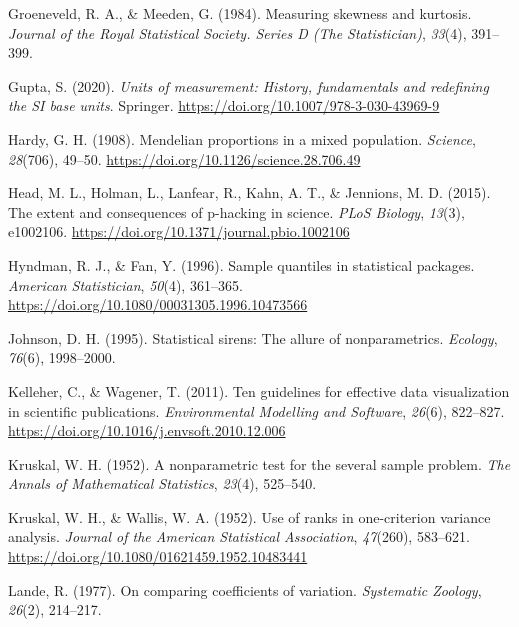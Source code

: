 \documentclass[
  openany]{krantz}
\newlength{\cslhangindent}
\newlength{\cslentryspacingunit} %
\newenvironment{CSLReferences}[2] %
 {%
  \setlength{\parindent}{0pt}
  \ifodd #1
  \let\oldpar\par
  \def\par{\hangindent=\cslhangindent\oldpar}
  \fi
  \setlength{\parskip}{#2\cslentryspacingunit}
 }%
 {}
\begin{document}
\begin{CSLReferences}{1}{0}
\leavevmode{}%
Groeneveld, R. A., \& Meeden, G. (1984). Measuring skewness and kurtosis. \emph{Journal of the Royal Statistical Society. Series D (The Statistician)}, \emph{33}(4), 391--399.

\leavevmode{}%
Gupta, S. (2020). \emph{Units of measurement: History, fundamentals and redefining the SI base units}. Springer. \url{https://doi.org/10.1007/978-3-030-43969-9}

\leavevmode{}%
Hardy, G. H. (1908). {Mendelian proportions in a mixed population}. \emph{Science}, \emph{28}(706), 49--50. \url{https://doi.org/10.1126/science.28.706.49}

\leavevmode{}%
Head, M. L., Holman, L., Lanfear, R., Kahn, A. T., \& Jennions, M. D. (2015). {The extent and consequences of p-hacking in science}. \emph{PLoS Biology}, \emph{13}(3), e1002106. \url{https://doi.org/10.1371/journal.pbio.1002106}

\leavevmode{}%
Hyndman, R. J., \& Fan, Y. (1996). Sample quantiles in statistical packages. \emph{American Statistician}, \emph{50}(4), 361--365. \url{https://doi.org/10.1080/00031305.1996.10473566}

\leavevmode{}%
Johnson, D. H. (1995). {Statistical sirens: The allure of nonparametrics}. \emph{Ecology}, \emph{76}(6), 1998--2000.

\leavevmode{}%
Kelleher, C., \& Wagener, T. (2011). {Ten guidelines for effective data visualization in scientific publications}. \emph{Environmental Modelling and Software}, \emph{26}(6), 822--827. \url{https://doi.org/10.1016/j.envsoft.2010.12.006}

\leavevmode{}%
Kruskal, W. H. (1952). {A nonparametric test for the several sample problem}. \emph{The Annals of Mathematical Statistics}, \emph{23}(4), 525--540.

\leavevmode{}%
Kruskal, W. H., \& Wallis, W. A. (1952). Use of ranks in one-criterion variance analysis. \emph{Journal of the American Statistical Association}, \emph{47}(260), 583--621. \url{https://doi.org/10.1080/01621459.1952.10483441}

\leavevmode{}%
Lande, R. (1977). {On comparing coefficients of variation.} \emph{Systematic Zoology}, \emph{26}(2), 214--217.


\end{CSLReferences}
\end{document}
